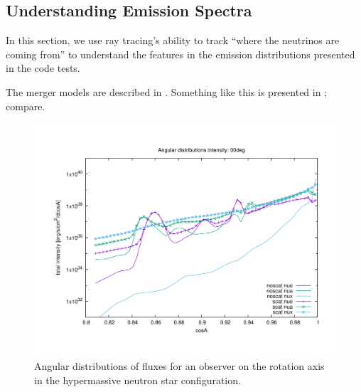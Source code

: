 \documentclass[aps,floatfix,prd,superscriptaddress,twocolumn]{revtex4-1}
\newcommand{\todo}[1]{\marginpar{\tiny{\textcolor{red}{#1}}}}
\renewcommand\todo[1]{} %
\begin{document}
\subsection{Understanding Emission Spectra}
\label{ssec:spectra}
In this section, we use ray tracing's ability to track ``where the neutrinos
are coming from'' to understand the features in the emission distributions
presented in the code tests.

The merger models are described in \cite{fouc2015-m1_nsbh, fouc2016-m1_nsns}.
Something like this is presented in \cite[Figs.~10-11]{pere2014-nu_wind};
compare.
\todo{here focus on plots of $J(\cos A)$, $H^r(\cos A)$, and $J(\varepsilon)$}

\begin{figure}
  \includegraphics[width=\columnwidth]{cosA_distrib-intensity-250km-00deg}
  \caption{Angular distributions of fluxes for an observer on the rotation axis
    in the hypermassive neutron star configuration.}
  \label{fig:nsns_cosA_distrib_I_00deg}
\end{figure}
\end{document}
